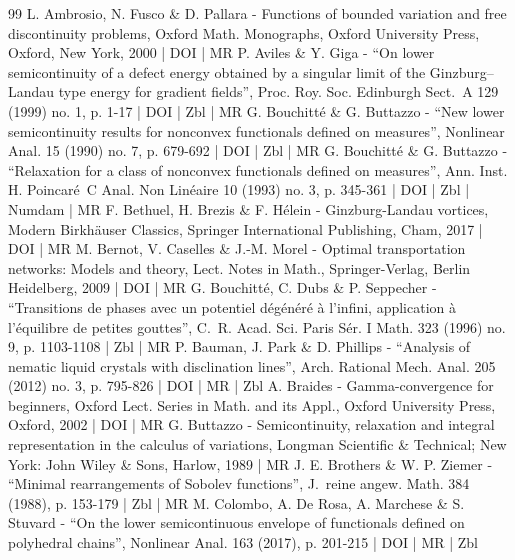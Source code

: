 \begin{thebibliography}{99}
L. Ambrosio, N. Fusco \& D. Pallara - Functions of bounded variation and free discontinuity problems, Oxford Math. Monographs, Oxford University Press, Oxford, New York, 2000 | DOI | MR
P. Aviles \& Y. Giga - “On lower semicontinuity of a defect energy obtained by a singular limit of the Ginzburg–Landau type energy for gradient fields”, Proc. Roy. Soc. Edinburgh Sect. A 129 (1999) no. 1, p. 1-17 | DOI | Zbl | MR
G. Bouchitté \& G. Buttazzo - “New lower semicontinuity results for nonconvex functionals defined on measures”, Nonlinear Anal. 15 (1990) no. 7, p. 679-692 | DOI | Zbl | MR
G. Bouchitté \& G. Buttazzo - “Relaxation for a class of nonconvex functionals defined on measures”, Ann. Inst. H. Poincaré C Anal. Non Linéaire 10 (1993) no. 3, p. 345-361 | DOI | Zbl | Numdam | MR
F. Bethuel, H. Brezis \& F. Hélein - Ginzburg-Landau vortices, Modern Birkhäuser Classics, Springer International Publishing, Cham, 2017 | DOI | MR
M. Bernot, V. Caselles \& J.-M. Morel - Optimal transportation networks: Models and theory, Lect. Notes in Math., Springer-Verlag, Berlin Heidelberg, 2009 | DOI | MR
G. Bouchitté, C. Dubs \& P. Seppecher - “Transitions de phases avec un potentiel dégénéré à l’infini, application à l’équilibre de petites gouttes”, C. R. Acad. Sci. Paris Sér. I Math. 323 (1996) no. 9, p. 1103-1108 | Zbl | MR
P. Bauman, J. Park \& D. Phillips - “Analysis of nematic liquid crystals with disclination lines”, Arch. Rational Mech. Anal. 205 (2012) no. 3, p. 795-826 | DOI | MR | Zbl
A. Braides - Gamma-convergence for beginners, Oxford Lect. Series in Math. and its Appl., Oxford University Press, Oxford, 2002 | DOI | MR
G. Buttazzo - Semicontinuity, relaxation and integral representation in the calculus of variations, Longman Scientific \& Technical; New York: John Wiley \& Sons, Harlow, 1989 | MR
J. E. Brothers \& W. P. Ziemer - “Minimal rearrangements of Sobolev functions”, J. reine angew. Math. 384 (1988), p. 153-179 | Zbl | MR
M. Colombo, A. De Rosa, A. Marchese \& S. Stuvard - “On the lower semicontinuous envelope of functionals defined on polyhedral chains”, Nonlinear Anal. 163 (2017), p. 201-215 | DOI | MR | Zbl

\end{thebibliography}
